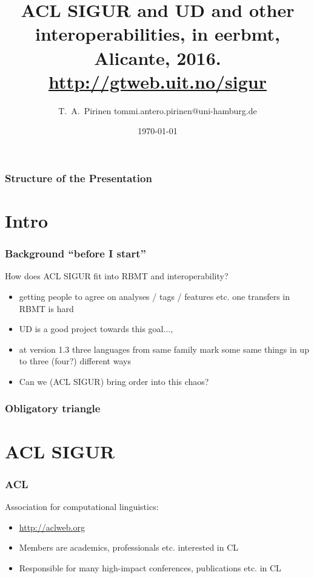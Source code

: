 \documentclass{beamer}
\title{ACL SIGUR and UD and other interoperabilities,
\scriptsize{in eerbmt, Alicante, 2016.\\
\url{http://gtweb.uit.no/sigur}}}
\author{T.~A.~Pirinen 
\scriptsize \guilsinglleft tommi.antero.pirinen@uni-hamburg.de \guilsinglright }
\institute{Universität Hamburg, ACL SIGUR, CLARIN-D and various others}
\date{\today}
\begin{document}


\maketitle

\begin{frame}
    \frametitle{Structure of the Presentation}
    \tableofcontents
\end{frame}

\section{Intro}

\begin{frame}
    \frametitle{Background ``before I start''}
    How does ACL SIGUR fit into RBMT and interoperability?
    \begin{itemize}
        \item getting people to agree on analyses / tags / features
            etc. one transfers in RBMT is hard
        \item UD is a good project towards this goal...,
        \item at version 1.3 three languages from same family mark some same
            things in up to three (four?) different ways
        \item Can we (ACL SIGUR) bring order into this chaos?
    \end{itemize}
\end{frame}

\begin{frame}
    \frametitle{Obligatory triangle}
\end{frame}

\section{ACL SIGUR}

\begin{frame}
    \frametitle{ACL}
    Association for computational linguistics:
    \begin{itemize}
        \item \url{http://aclweb.org}
        \item Members are academics, professionals etc. interested in CL
        \item Responsible for many high-impact conferences, publications
            etc. in CL
    \end{itemize}
\end{frame}
\end{document}
